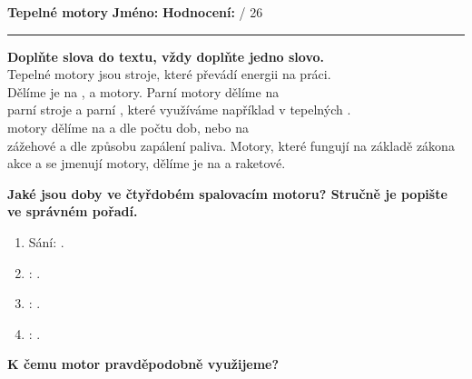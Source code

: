 \documentclass[../main.tex]{subfiles}
\begin{document}
\pagestyle{empty}

{\Large\textbf{Tepelné motory}}
\hfill
\textbf{Jméno:}
\tecky{5cm}
\hspace{0.25cm}
\textbf{Hodnocení:}
\tecky{0.5cm}
{/}
{26}
\vspace{0.25cm}
\hrule

\begin{enumerate}[label={\textbf{\arabic*.}}]
    \item \textbf{Doplňte slova do textu, vždy doplňte jedno slovo.}\vspace{0.25cm}\\ 
    {Tepelné motory jsou stroje, které převádí \cara{3cm} energii na \cara{4cm} práci. \\
    Dělíme je na \cara{3cm}, \cara{3cm} a \cara{3cm} motory. Parní motory dělíme na \\
    parní stroje a parní \cara{3cm}, které využíváme například v tepelných \cara{3cm}.\\
    \cara{3cm} motory dělíme na \cara{3cm} a \cara{3cm} dle počtu dob, nebo na \\
    zážehové a \cara{3cm} dle způsobu zapálení paliva. Motory, které fungují na základě zákona\\
    akce a \cara{3cm} se jmenují \cara{3cm} motory, dělíme je na \cara{3cm} a raketové.}
    \vspace{-0.5cm}
    \item \textbf{Jaké jsou doby ve čtyřdobém spalovacím motoru? Stručně je popište ve správném pořadí.}
    \begin{enumerate}[label={\arabic*.}]
        \item {Sání:}\hspace{1.75cm}\tecky{14cm} .
        \item \tecky{2cm}:\hspace{0.5cm}{Píst jede směrem nahoru, oba ventily jsou zavřeny. Tlak a teplota rostou} .
        \item \tecky{2cm}:\hspace{0.5cm}\tecky{14cm} .
        \item \tecky{2cm}:\hspace{0.5cm}\tecky{14cm} .
    \end{enumerate}
    \vspace{-0.5cm}
    \begin{minipage}{0.45\textwidth}
        \item \textbf{K čemu motor pravděpodobně využijeme?}

\end{minipage}
\end{enumerate}
\end{document}

